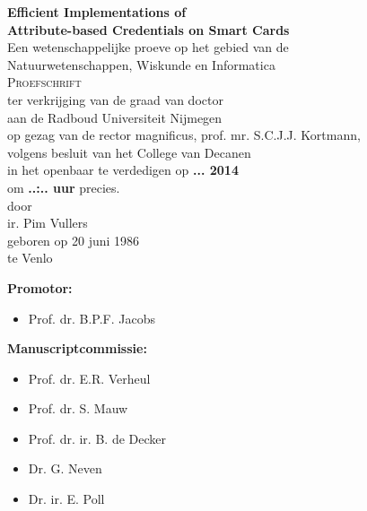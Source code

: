 \thispagestyle{empty}

\begin{center}
  \textbf{\Large Efficient Implementations of\\ Attribute-based Credentials on Smart Cards}\\[15mm]

  Een wetenschappelijke proeve op het gebied van de \\
  Natuurwetenschappen, Wiskunde en Informatica \\[15mm]

  \textsc{Proefschrift} \\[15mm]

  ter verkrijging van de graad van doctor \\
  aan de Radboud Universiteit Nijmegen \\
  op gezag van de rector magnificus, prof. mr. S.C.J.J. Kortmann, \\
  volgens besluit van het College van Decanen \\
  in het openbaar te verdedigen op \textbf{... 2014} \\
  om \textbf{..:.. uur} precies. \\[30mm]

  door \\[30mm]

  ir. Pim Vullers \\[15mm]

  geboren op 20 juni 1986 \\
  te Venlo
\end{center}

\clearpage

\thispagestyle{empty}

\textbf{Promotor:}
\begin{itemize}
  \item[~] Prof. dr. B.P.F. Jacobs
\end{itemize}

\textbf{Manuscriptcommissie:}
\begin{itemize}
  \item[~] Prof. dr. E.R. Verheul
  \item[~] Prof. dr. S. Mauw
  \item[~] Prof. dr. ir. B. de Decker
  \item[~] Dr. G. Neven
  \item[~] Dr. ir. E. Poll
\end{itemize}